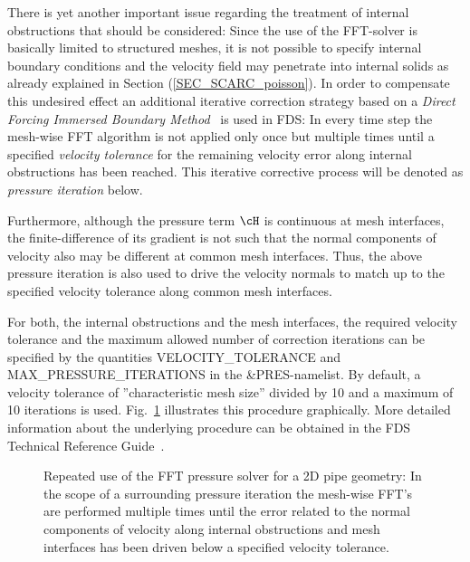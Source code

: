 There is yet another important issue regarding the treatment of internal obstructions that should be considered:
Since the use of the FFT-solver is basically limited to structured meshes, it is not possible to specify internal boundary conditions and the velocity field may penetrate into internal solids as already explained in Section (\ref{SEC_SCARC_poisson}). 
%
In order to compensate this undesired effect an additional iterative correction strategy based on a {\it Direct Forcing Immersed Boundary Method}~\cite{Fadlun:2000} is used in FDS: In every time step the mesh-wise FFT algorithm is not applied only once but multiple times until a specified {\it velocity tolerance} for the remaining velocity error along internal obstructions has been reached. This iterative corrective process will be denoted as {\it pressure iteration} below.

Furthermore, although the pressure term $\cH$ is continuous at mesh interfaces, the finite-difference of its gradient is not such that the normal components of velocity also may be different at common mesh interfaces. Thus, the above pressure iteration is also used to drive the velocity normals to match up to the specified velocity tolerance along common mesh interfaces.

For both, the internal obstructions and the mesh interfaces, the required velocity tolerance and the maximum allowed number of correction iterations can be specified by the quantities {\ct VELOCITY\_TOLERANCE} and {\ct  MAX\_PRESSURE\_ITERATIONS} 
in the {\ct \&PRES}-namelist. By default, a velocity tolerance of ''characteristic mesh size'' divided by 10 and a maximum of 10 iterations is used. Fig.~\ref{FIG_SCARC_multi_pipe_fft_presite} illustrates this procedure graphically.
More detailed information about the underlying procedure can be obtained in the FDS Technical Reference Guide~\cite{McGrattan:2018:TG}.

\begin{figure}[ht]
\begin{center}

\caption[Mesh-wise FFT-methods with pressure correction]{Repeated use of the FFT pressure solver for a 2D pipe geometry: In the scope of a surrounding pressure iteration the mesh-wise FFT's are performed multiple times until the error related to the normal components of velocity along internal obstructions and mesh interfaces has been driven below a specified velocity tolerance.}
\label{FIG_SCARC_multi_pipe_fft_presite}
\end{center}
\end{figure}

